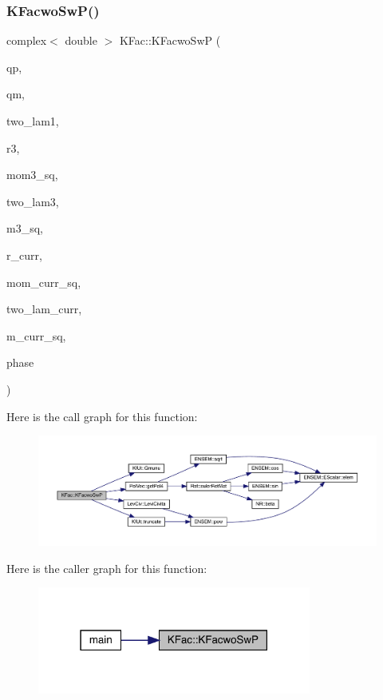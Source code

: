 \subsubsection{\texorpdfstring{KFacwoSwP()}{KFacwoSwP()}}
{\footnotesize\ttfamily complex$<$ double $>$ K\+Fac\+::\+K\+Facwo\+SwP (\begin{DoxyParamCaption}\item[{Eigen\+::\+Vector\+Xd \&}]{qp,  }\item[{Eigen\+::\+Vector\+Xd \&}]{qm,  }\item[{const int \&}]{two\+\_\+lam1,  }\item[{std\+::vector$<$ double $>$ \&}]{r3,  }\item[{double \&}]{mom3\+\_\+sq,  }\item[{const int \&}]{two\+\_\+lam3,  }\item[{double \&}]{m3\+\_\+sq,  }\item[{std\+::vector$<$ double $>$ \&}]{r\+\_\+curr,  }\item[{double \&}]{mom\+\_\+curr\+\_\+sq,  }\item[{const int \&}]{two\+\_\+lam\+\_\+curr,  }\item[{double \&}]{m\+\_\+curr\+\_\+sq,  }\item[{\mbox{\hyperlink{structPh_1_1phChars}{Ph\+::ph\+Chars}} \&}]{phase }\end{DoxyParamCaption})}

Here is the call graph for this function\+:
\nopagebreak
\begin{figure}[H]
\begin{center}
\leavevmode
\includegraphics[width=350pt]{d2/d89/namespaceKFac_a2ae9d69821729f6946651703e8990e58_cgraph}
\end{center}
\end{figure}
Here is the caller graph for this function\+:\nopagebreak
\begin{figure}[H]
\begin{center}
\leavevmode
\includegraphics[width=255pt]{d2/d89/namespaceKFac_a2ae9d69821729f6946651703e8990e58_icgraph}
\end{center}
\end{figure}
\mbox{\label{namespaceKFac_a56130e258872427e83c530a5a471cf5c}} 

